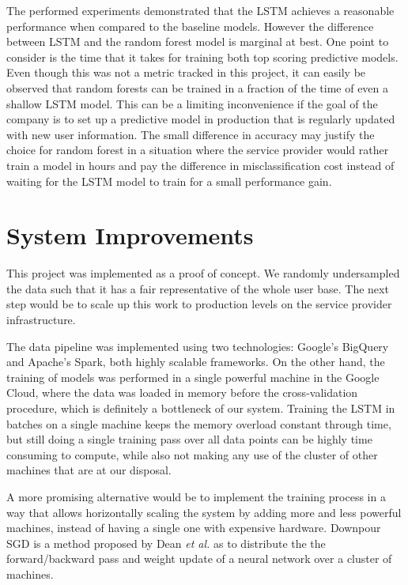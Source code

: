\documentclass{kththesis}
\begin{document}
The performed experiments demonstrated that the LSTM achieves a reasonable performance when compared to the baseline models. However the difference between LSTM and the random forest model is marginal at best. One point to consider is the time that it takes for training both top scoring predictive models. Even though this was not a metric tracked in this project, it can easily be observed that random forests can be trained in a fraction of the time of even a shallow LSTM model. This can be a limiting inconvenience if the goal of the company is to set up a predictive model in production that is regularly updated with new user information. The small difference in accuracy may justify the choice for random forest in a situation where the service provider would rather train a model in hours and pay the difference in misclassification cost instead of waiting for the LSTM model to train for a small performance gain. 

\section{System Improvements}

This project was implemented as a proof of concept. We randomly undersampled the data such that it has a fair representative of the whole user base. The next step would be to scale up this work to production levels on the service provider infrastructure. 

The data pipeline was implemented using two technologies: Google's BigQuery and Apache's Spark, both highly scalable frameworks. On the other hand, the training of models was performed in a single powerful machine in the Google Cloud, where the data was loaded in memory before the cross-validation procedure, which is definitely a bottleneck of our system. Training the LSTM in batches on a single machine keeps the memory overload constant through time, but still doing a single training pass over all data points can be highly time consuming to compute, while also not making any use of the cluster of other machines that are at our disposal. 

A more promising alternative would be to implement the training process in a way that allows horizontally scaling the system by adding more and less powerful machines, instead of having a single one with expensive hardware. Downpour SGD is a method proposed by Dean \emph{et al.} \citep{dean2012large} as to distribute the the forward/backward pass and weight update of a neural network over a cluster of machines.
\end{document}
